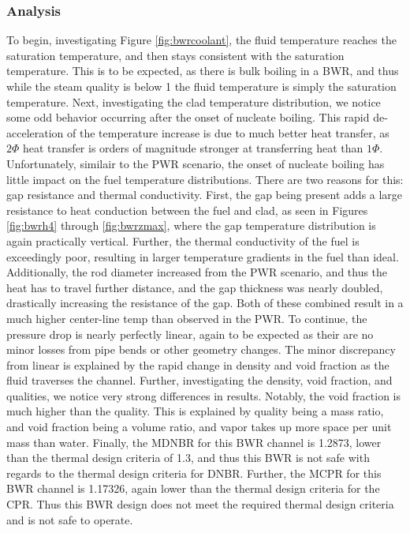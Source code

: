\documentclass{article}
\begin{document}
\subsubsection{Analysis}
To begin, investigating Figure \ref{fig:bwrcoolant}, the fluid temperature reaches the saturation temperature, and then stays consistent with the saturation temperature. This is to be expected, as there is bulk boiling in a BWR, and thus while the steam quality is below 1 the fluid temperature is simply the saturation temperature. Next, investigating the clad temperature distribution, we notice some odd behavior occurring after the onset of nucleate boiling. This rapid de-acceleration of the temperature increase is due to much better heat transfer, as $2\Phi$ heat transfer is orders of magnitude stronger at transferring heat than $1\Phi$. Unfortunately, similair to the PWR scenario, the onset of nucleate boiling has little impact on the fuel temperature distributions. There are two reasons for this: gap resistance and thermal conductivity. First, the gap being present adds a large resistance to heat conduction between the fuel and clad, as seen in Figures \ref{fig:bwrh4} through \ref{fig:bwrzmax}, where the gap temperature distribution is again practically vertical. Further, the thermal conductivity of the fuel is exceedingly poor, resulting in larger temperature gradients in the fuel than ideal. Additionally, the rod diameter increased from the PWR scenario, and thus the heat has to travel further distance, and the gap thickness was nearly doubled, drastically increasing the resistance of the gap. Both of these combined result in a much higher center-line temp than observed in the PWR. To continue, the pressure drop is nearly perfectly linear, again to be expected as their are no minor losses from pipe bends or other geometry changes. The minor discrepancy from linear is explained by the rapid change in density and void fraction as the fluid traverses the channel. Further, investigating the density, void fraction, and qualities, we notice very strong differences in results. Notably, the void fraction is much higher than the quality. This is explained by quality being a mass ratio, and void fraction being a volume ratio, and vapor takes up more space per unit mass than water. Finally, the MDNBR for this BWR channel is 1.2873, lower than the thermal design criteria of 1.3, and thus this BWR is not safe with regards to the thermal design criteria for DNBR. Further, the MCPR for this BWR channel is 1.17326, again lower than the thermal design criteria for the CPR. Thus this BWR design does not meet the required thermal design criteria and is not safe to operate. 
\end{document}
